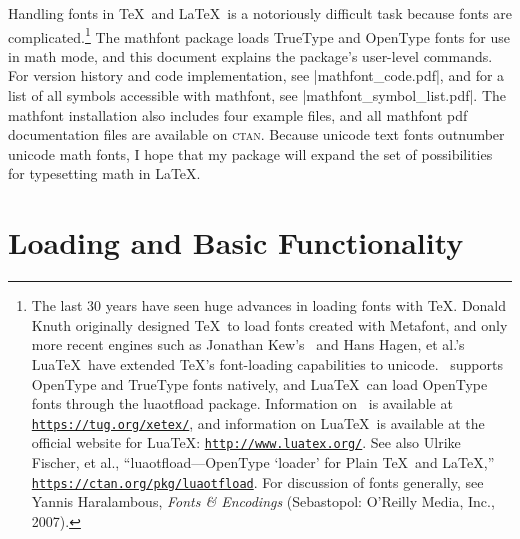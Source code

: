 \documentclass[12pt,twoside]{article}
\def\link#1{\href{#1}{\nolinkurl{#1}}}
\begin{document}
\def\ref#1{\csname fig@#1\endcsname}

\def\documentname{User Guide}
\def\showabstract{1}


Handling fonts in \TeX\ and \LaTeX\ is a notoriously difficult task because fonts are complicated.\footnote{The last 30 years have seen huge advances in loading fonts with \TeX. Donald Knuth originally designed \TeX\ to load fonts created with Metafont, and only more recent engines such as Jonathan Kew's \XeTeX\ and Hans Hagen, et al.'s Lua\TeX\ have extended \TeX's font-loading capabilities to unicode. \XeTeX\ supports OpenType and TrueType fonts natively, and Lua\TeX\ can load OpenType fonts through the \textsf{luaotfload} package. Information on \XeTeX\ is available at \link{https://tug.org/xetex/}, and information on Lua\TeX\ is available at the official website for Lua\TeX: \link{http://www.luatex.org/}. See also Ulrike Fischer, et al., ``\textsf{luaotfload}---OpenType `loader' for Plain \TeX\ and \LaTeX,'' \link{https://ctan.org/pkg/luaotfload}. For discussion of fonts generally, see Yannis Haralambous, \textit{Fonts \& Encodings} (Sebastopol: O'Reilly Media, Inc., 2007).} The \textsf{mathfont} package loads TrueType and OpenType fonts for use in math mode, and this document explains the package's user-level commands. For version history and code implementation, see |mathfont_code.pdf|, and for a list of all symbols accessible with \textsf{mathfont}, see |mathfont_symbol_list.pdf|. The \textsf{mathfont} installation also includes four example files, and all \textsf{mathfont} pdf documentation files are available on \textsc{ctan}. Because unicode text fonts outnumber unicode math fonts, I hope that my package will expand the set of possibilities for typesetting math in \LaTeX.

\section{Loading and Basic Functionality}
\end{document}
